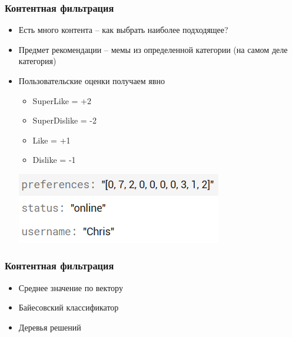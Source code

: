 \documentclass[xetex,mathserif,serif, xcolor=table]{beamer}
\begin{document}
	\begin{frame}
		\frametitle{Контентная фильтрация}
			\begin{itemize}
		    	\item Есть много контента – как выбрать наиболее подходящее?
		    	\item Предмет рекомендации – мемы из определенной категории (на самом деле категория)
		    	\item Пользовательские оценки получаем явно
		    	    \begin{itemize}
        		    	\item SuperLike = +2
        		    	\item SuperDislike = -2
        		    	\item Like = +1
        		    	\item Dislike = -1
        		    	\newline 
			        \end{itemize}
			      \includegraphics[scale=0.8]{images/user.png}   
			\end{itemize}
	\end{frame}
	
	
	\begin{frame}
	\frametitle{Контентная фильтрация}
        \begin{itemize}
            \item Среднее значение по вектору
            \item Байесовский классификатор
            \item Деревья решений
        \end{itemize}
	\end{frame}	
	
\end{document}
